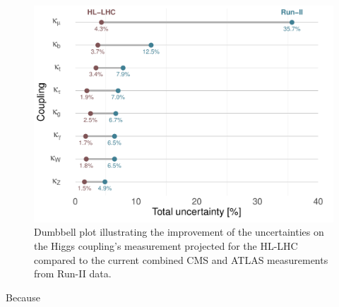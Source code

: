 \begin{figure}[htb!]
	\begin{center}
		\includegraphics[height=0.35\textheight]{figures/run2-hl-dumble}
		\caption{Dumbbell plot illustrating the improvement of the uncertainties on the Higgs coupling's measurement projected for the HL-LHC compared to the current combined CMS and ATLAS measurements from Run-II data.}	
		\label{fig:couplings-hlhlc}
	\end{center}
\end{figure}
Because
